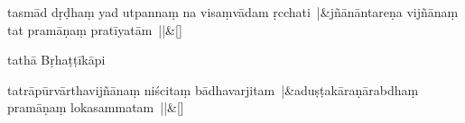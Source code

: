 \documentclass[article,12pt,a4paper]{memoir}%
\newcounter{parCount}
\begin{document}
	    
	    \stanza[\smallbreak]
	  tasmād dṛḍhaṃ yad utpannaṃ na visaṃvādam ṛcchati |&jñānāntareṇa vijñānaṃ tat pramāṇaṃ pratīyatām ||\&[\smallbreak]
	  
	  
	  

	  
	  \pstart \leavevmode%
	tathā Bṛhaṭṭīkāpi
	{}
	\pend%
      
	    
	    \stanza[\smallbreak]
	  \label{ratnakīrtinibandhāvali__36r1PD1OQIW6MGHHK6UP56XMABT}tatrāpūrvārthavijñānaṃ niścitaṃ bādhavarjitam |&aduṣṭakāraṇārabdhaṃ pramāṇaṃ lokasammatam ||\&[\smallbreak]
	  
	  
	  
\end{document}
